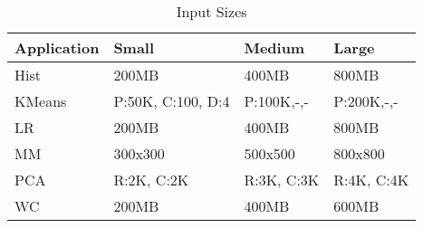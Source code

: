 \begin{frame}[t]
\begin{columns}[t]
\begin{onlyenv}
\begin{table}
{				\begin{tabular}{|@{} l| @{} l | @{} l| @{} l|}
					\hline
					\textbf{Application} & \textbf{Small} & \textbf{Medium} & \textbf{Large}\\
					\hline
					Hist & 200MB & 400MB & 800MB\\
					\hline
					KMeans & P:50K, C:100, D:4 & P:100K,-,- & P:200K,-,-\\
					\hline
					LR & 200MB & 400MB & 800MB\\
					\hline
					MM & 300x300 & 500x500 & 800x800\\
					\hline
					PCA & R:2K, C:2K & R:3K, C:3K & R:4K, C:4K\\
					\hline
					WC & 200MB & 400MB & 600MB\\
					\hline
				\end{tabular}
			}
			\caption*{Input Sizes}
		\end{table}
	\end{onlyenv}		
	\end{columns}
\end{frame}

